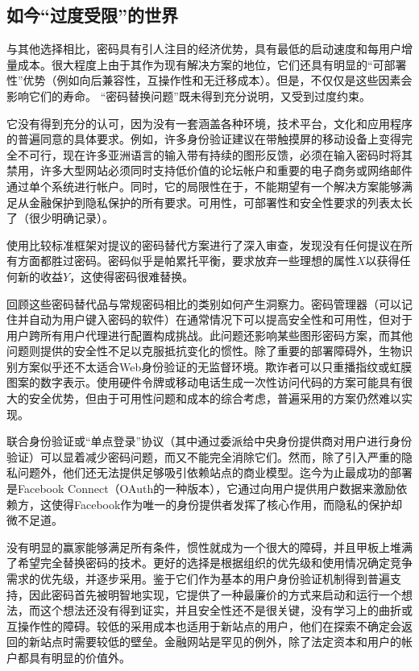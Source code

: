 \subsection{如今“过度受限”的世界}


与其他选择相比，密码具有引人注目的经济优势，具有最低的启动速度和每用户增量成本。很大程度上由于其作为现有解决方案的地位，它们还具有明显的“可部署性”优势（例如向后兼容性，互操作性和无迁移成本）。但是，不仅仅是这些因素会影响它们的寿命。 “密码替换问题”既未得到充分说明，又受到过度约束。

它没有得到充分的认可，因为没有一套涵盖各种环境，技术平台，文化和应用程序的普遍同意的具体要求。例如，许多身份验证建议在带触摸屏的移动设备上变得完全不可行，现在许多亚洲语言的输入带有持续的图形反馈，必须在输入密码时将其禁用，许多大型网站必须同时支持低价值的论坛帐户和重要的电子商务或网络邮件通过单个系统进行帐户。同时，它的局限性在于，不能期望有一个解决方案能够满足从金融保护到隐私保护的所有要求。可用性，可部署性和安全性要求的列表太长了（很少明确记录）。

使用比较标准框架对提议的密码替代方案进行了深入审查，发现没有任何提议在所有方面都胜过密码。密码似乎是帕累托平衡，要求放弃一些理想的属性$X$以获得任何新的收益$Y$，这使得密码很难替换。

回顾这些密码替代品与常规密码相比的类别如何产生洞察力。密码管理器（可以记住并自动为用户键入密码的软件）在通常情况下可以提高安全性和可用性，但对于用户跨所有用户代理进行配置构成挑战。此问题还影响某些图形密码方案，而其他问题则提供的安全性不足以克服抵抗变化的惯性。除了重要的部署障碍外，生物识别方案似乎还不太适合Web身份验证的无监督环境。欺诈者可以只重播指纹或虹膜图案的数字表示。使用硬件令牌或移动电话生成一次性访问代码的方案可能具有很大的安全优势，但由于可用性问题和成本的综合考虑，普遍采用的方案仍然难以实现。

联合身份验证或“单点登录”协议（其中通过委派给中央身份提供商对用户进行身份验证）可以显着减少密码问题，而又不能完全消除它们。然而，除了引入严重的隐私问题外，他们还无法提供足够吸引依赖站点的商业模型。迄今为止最成功的部署是Facebook Connect（OAuth的一种版本），它通过向用户提供用户数据来激励依赖方，这使得Facebook作为唯一的身份提供者发挥了核心作用，而隐私的保护却微不足道。

没有明显的赢家能够满足所有条件，惯性就成为一个很大的障碍，并且甲板上堆满了希望完全替换密码的技术。更好的选择是根据组织的优先级和使用情况确定竞争需求的优先级，并逐步采用。鉴于它们作为基本的用户身份验证机制得到普遍支持，因此密码首先被明智地实现，它提供了一种最廉价的方式来启动和运行一个想法，而这个想法还没有得到证实，并且安全性还不是很关键，没有学习上的曲折或互操作性的障碍。较低的采用成本也适用于新站点的用户，他们在探索不确定会返回的新站点时需要较低的壁垒。金融网站是罕见的例外，除了法定资本和用户的帐户都具有明显的价值外。

